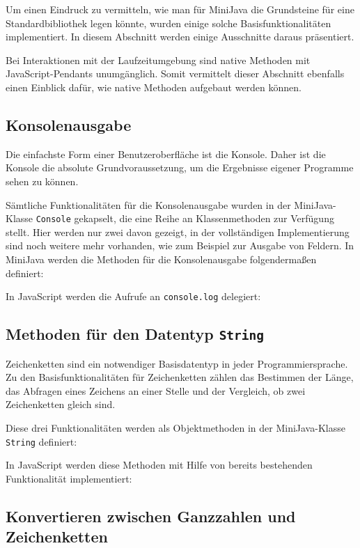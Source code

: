 Um einen Eindruck zu vermitteln, wie man für MiniJava die Grundsteine für eine Standardbibliothek legen könnte, wurden einige solche Basisfunktionalitäten implementiert. In diesem Abschnitt werden einige Ausschnitte daraus präsentiert.

Bei Interaktionen mit der Laufzeitumgebung sind native Methoden mit JavaScript-Pendants unumgänglich. Somit vermittelt dieser Abschnitt ebenfalls einen Einblick dafür, wie native Methoden aufgebaut werden können.

\subsection{Konsolenausgabe}
Die einfachste Form einer Benutzeroberfläche ist die Konsole. Daher ist die Konsole die absolute Grundvoraussetzung, um die Ergebnisse eigener Programme sehen zu können.

Sämtliche Funktionalitäten für die Konsolenausgabe wurden in der MiniJava-Klasse \lstinline{Console} gekapselt, die eine Reihe an Klassenmethoden zur Verfügung stellt. Hier werden nur zwei davon gezeigt, in der vollständigen Implementierung sind noch weitere mehr vorhanden, wie zum Beispiel zur Ausgabe von Feldern. In MiniJava werden die Methoden für die Konsolenausgabe folgendermaßen definiert:


In JavaScript werden die Aufrufe an \lstinline{console.log} delegiert:


\subsection{Methoden für den Datentyp \lstinline{String}}

Zeichenketten sind ein notwendiger Basisdatentyp in jeder Programmiersprache. Zu den Basisfunktionalitäten für Zeichenketten zählen das Bestimmen der Länge, das Abfragen eines Zeichens an einer Stelle und der Vergleich, ob zwei Zeichenketten gleich sind.

Diese drei Funktionalitäten werden als Objektmethoden in der MiniJava-Klasse \lstinline{String} definiert:


In JavaScript werden diese Methoden mit Hilfe von bereits bestehenden Funktionalität implementiert:


\subsection{Konvertieren zwischen Ganzzahlen und Zeichenketten}

